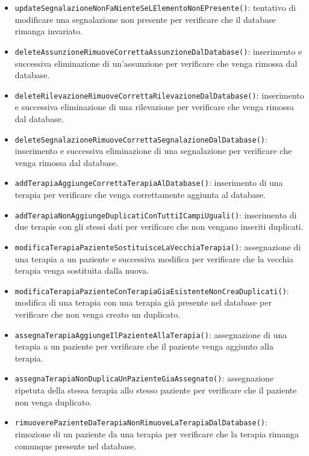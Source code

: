 \begin{itemize}
	\item \texttt{updateSegnalazioneNonFaNienteSeLElementoNonEPresente()}: tentativo di modificare una segnalazione non presente per verificare che il database rimanga invariato.
	
	\item \texttt{deleteAssunzioneRimuoveCorrettaAssunzioneDalDatabase()}: inserimento e successiva eliminazione di un'assunzione per verificare che venga rimossa dal database.
	
	\item \texttt{deleteRilevazioneRimuoveCorrettaRilevazioneDalDatabase()}: inserimento e successiva eliminazione di una rilevazione per verificare che venga rimossa dal database.
	
	\item \texttt{deleteSegnalazioneRimuoveCorrettaSegnalazioneDalDatabase()}: inserimento e successiva eliminazione di una segnalazione per verificare che venga rimossa dal database.
	
	\item \texttt{addTerapiaAggiungeCorrettaTerapiaAlDatabase()}: inserimento di una terapia per verificare che venga correttamente aggiunta al database.
	
	\item \texttt{addTerapiaNonAggiungeDuplicatiConTuttiICampiUguali()}: inserimento di due terapie con gli stessi dati per verificare che non vengano inseriti duplicati.
	
	\item \texttt{modificaTerapiaPazienteSostituisceLaVecchiaTerapia()}: assegnazione di una terapia a un paziente e successiva modifica per verificare che la vecchia terapia venga sostituita dalla nuova.
	
	\item \texttt{modificaTerapiaPazienteConTerapiaGiaEsistenteNonCreaDuplicati()}: modifica di una terapia con una terapia già presente nel database per verificare che non venga creato un duplicato.
	
	\item \texttt{assegnaTerapiaAggiungeIlPazienteAllaTerapia()}: assegnazione di una terapia a un paziente per verificare che il paziente venga aggiunto alla terapia.
	
	\item \texttt{assegnaTerapiaNonDuplicaUnPazienteGiaAssegnato()}: assegnazione ripetuta della stessa terapia allo stesso paziente per verificare che il paziente non venga duplicato.
	
	\item \texttt{rimuoverePazienteDaTerapiaNonRimuoveLaTerapiaDalDatabase()}: rimozione di un paziente da una terapia per verificare che la terapia rimanga comunque presente nel database.
	

\end{itemize}
